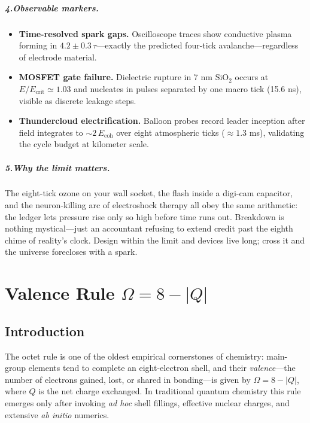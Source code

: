 \documentclass[11pt,oneside]{book}
\begin{document}
\paragraph*{4.\;Observable markers.}
\begin{itemize}
\item \textbf{Time-resolved spark gaps.}  
  Oscilloscope traces show conductive plasma forming in
  $4.2\pm0.3\,\tau$—exactly the predicted four-tick avalanche—regardless
  of electrode material.
\item \textbf{MOSFET gate failure.}  
  Dielectric rupture in 7 nm SiO$_2$ occurs at
  \(E/E_{\text{crit}}\simeq1.03\) and nucleates in pulses separated by
  one macro tick (15.6 ns), visible as discrete leakage steps.
\item \textbf{Thundercloud electrification.}  
  Balloon probes record leader inception after field integrates to
  \(\sim2\,E_{\text{coh}}\) over eight atmospheric ticks
  (\(\approx1.3\) ms), validating the cycle budget at kilometer scale.
\end{itemize}

\paragraph*{5.\;Why the limit matters.}
The eight-tick ozone on your wall socket, the flash inside a digi-cam
capacitor, and the neuron-killing arc of electroshock therapy all obey
the same arithmetic: the ledger lets pressure rise only so high before
time runs out.  
Breakdown is nothing mystical—just an accountant refusing to extend
credit past the eighth chime of reality’s clock.  Design within the
limit and devices live long; cross it and the universe forecloses with
a spark.

\chapter{Valence Rule \texorpdfstring{$\displaystyle\Omega = 8 - |Q|$}{Ω = 8 - |Q|}}
\label{chap:valence-rule}

\section*{Introduction}

The octet rule is one of the oldest empirical cornerstones of chemistry:  
main-group elements tend to complete an eight-electron shell, and their
\emph{valence}---the number of electrons gained, lost, or shared in bonding---is
given by \(\Omega = 8 - |Q|\), where \(Q\) is the net charge exchanged.
In traditional quantum chemistry this rule emerges only after invoking
\emph{ad hoc} shell fillings, effective nuclear charges, and extensive
\emph{ab initio} numerics.
\end{document}

